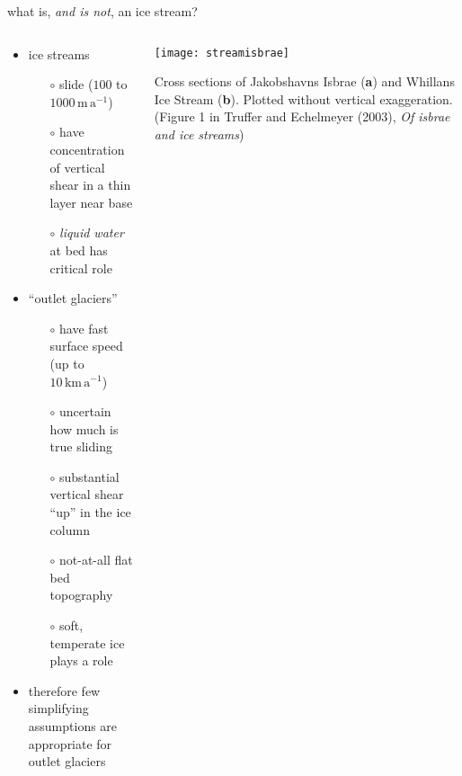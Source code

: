 \begin{frame}{what is, \emph{and is not}, an ice stream?}

\begin{columns}
\begin{column}{0.6\textwidth}
\begin{itemize}
\item ice streams 
  \small
  \begin{itemize}
  \item[$\circ$] slide ($100$ to $1000 \,\text{m}\,\text{a}^{-1}$)
  \item[$\circ$] have concentration of vertical shear in a thin layer near base
  \item[$\circ$] \emph{liquid water} at bed has critical role 
  \end{itemize}
  \normalsize
\item ``outlet glaciers''
  \begin{itemize}
  \item[$\circ$] have fast surface speed (up to $10 \,\text{km}\,\text{a}^{-1}$)
  \item[$\circ$] uncertain how much is true sliding
  \item[$\circ$] substantial vertical shear ``up'' in the ice column
  \item[$\circ$] not-at-all flat bed topography
  \item[$\circ$] soft, temperate ice plays a role
  \end{itemize} 
\item therefore \alert{few simplifying assumptions are appropriate for outlet glaciers}
\end{itemize}
\end{column}

\begin{column}{0.4\textwidth}
\texttt{[image: streamisbrae]}

\bigskip
\scriptsize 
Cross sections of Jakobshavns Isbrae (\textbf{a}) and
Whillans Ice Stream (\textbf{b}).  Plotted
without vertical exaggeration.  (\tiny Figure 1 in Truffer and Echelmeyer (2003), \emph{Of isbrae and ice streams}\scriptsize)
\end{column}
\end{columns}
\end{frame}


